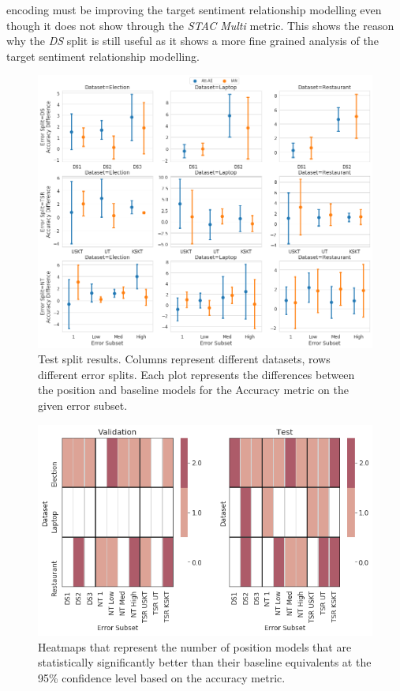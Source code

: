 encoding must be improving the target sentiment relationship modelling even though it does not show through the \textit{STAC Multi} metric. This shows the reason why the \textit{DS} split is still useful as it shows a more fine grained analysis of the target sentiment relationship modelling. 

\begin{figure}[h!]
    \centering
    \includegraphics[scale=0.32]{images/augmentation/methods_performance/Position_Encoding/position_split_difference_test_results.png}
    \caption{Test split results. Columns represent different datasets, rows different error splits. Each plot represents the differences between the position and baseline models for the Accuracy metric on the given error subset.}
    \label{fig:aug_position_split_difference_test_results}
\end{figure}

\begin{figure}[h!]
    \centering
    \includegraphics[scale=0.5]{images/augmentation/methods_performance/Position_Encoding/position_dataset_subset_heatmap.png}
    \caption{Heatmaps that represent the number of position models that are statistically significantly better than their baseline equivalents at the 95\% confidence level based on the accuracy metric.}
    \label{fig:aug_position_dataset_subset_heatmap}
\end{figure}

